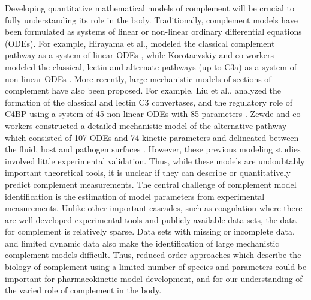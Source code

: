 \documentclass[12pt]{article}
\begin{document}
Developing quantitative mathematical models of complement will be crucial to fully understanding its role in the body.
Traditionally, complement models have been formulated as systems of linear or non-linear ordinary differential equations (ODEs).
For example, Hirayama et al., modeled the classical complement pathway as a system of linear ODEs \cite{hirayama1996linear},
while Korotaevskiy and co-workers modeled the classical, lectin and alternate pathways (up to C3a) as a system of non-linear ODEs \cite{korotaevskiy2009non}.
More recently, large mechanistic models of sections of complement have also been proposed.
For example, Liu et al., analyzed the formation of the classical and lectin C3 convertases, and the regulatory role of C4BP using a system of 45 non-linear ODEs with 85 parameters \cite{liu2011computational}.
Zewde and co-workers constructed a detailed mechanistic model of the alternative pathway which consisted of 107 ODEs and 74 kinetic parameters and delineated between
the fluid, host and pathogen surfaces \cite{zewde2016quantitative}.
However, these previous modeling studies involved little experimental validation.
Thus, while these models are undoubtably important theoretical tools, it is unclear if they can describe or quantitatively predict complement measurements.
The central challenge of complement model identification is the estimation of model parameters from experimental measurements.
Unlike other important cascades, such as coagulation where there are well developed experimental tools and publicly available data sets,
the data for complement is relatively sparse. Data sets with missing or incomplete data, and limited dynamic
data also make the identification of large mechanistic complement models difficult.
Thus, reduced order approaches which describe the biology of complement using a limited number of species and parameters
could be important for pharmacokinetic model development, and for our understanding of the varied role of complement in the body.

\end{document}
